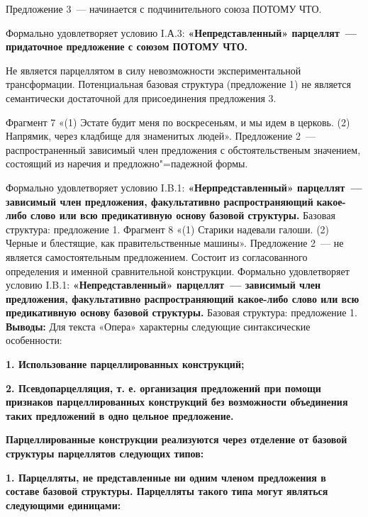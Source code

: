 \documentclass{kursa4}
\begin{document}
     Предложение 3~--- начинается с подчинительного союза ПОТОМУ ЧТО. 

     Формально удовлетворяет условию I.А.3: \textbf{«Непредставленный» парцеллят~--- придаточное предложение с союзом ПОТОМУ ЧТО.} 

     Не является парцеллятом в силу невозможности экспериментальной трансформации. Потенциальная базовая структура (предложение 1) не является семантически достаточной для присоединения предложения 3. 

     Фрагмент 7 «(1) Эстате будит меня по воскресеньям, и мы идем в церковь. (2) Напрямик, через кладбище для знаменитых людей». Предложение 2~--- распространенный зависимый член предложения с обстоятельственым значением, состоящий из наречия и предложно"=падежной формы. 

     Формально удовлетворяет условию I.B.1: \textbf{«}\textbf{Нерпредставленный» парцеллят~--- зависимый член предложения, факультативно распространяющий }\textbf{какое-либо слово или всю предикативную основу базовой структуры. }Базовая структура: предложение 1. Фрагмент 8 «(1) Старики надевали галоши. (2) Черные и блестящие, как правительственные машины». Предложение 2~--- не является самостоятельным предложением. Состоит из согласованного определения и именной сравнительной конструкции. Формально удовлетворяет условию I.B.1: \textbf{«}\textbf{Непредставленный» парцеллят~--- зависимый член предложения, факультативно распространяющий какое-либо слово или всю предикативную основу базовой структуры.} Базовая структура: предложение 1. \textbf{Выводы:} \textmd{Для текста «Опера» характерны следующие синтаксические особенности:}

      {\bfseries\color[rgb]{0.2,0.2,0.2}
      \textmd{1. Использование парцеллированных конструкций;}}

      {\bfseries\color[rgb]{0.2,0.2,0.2}
      \textmd{2. Псевдопарцелляция, т. е. организация предложений при помощи признаков парцеллированных конструкций }\textmd{без возможности объединения таких предложений в одно цельное предложение.}}

      {\bfseries\color[rgb]{0.2,0.2,0.2}
      \textmd{}Парцеллированные конструкции\textmd{ }\textmd{реализуются через отделение от базовой структуры парцеллятов следующих типов}\textmd{:}}

      {\bfseries\color[rgb]{0.2,0.2,0.2}
      \textmd{}\textmd{1. Парцелляты, не представленные ни одним членом предложения в составе базовой структуры. Парцелляты такого типа могут являться следующими единицами:}}
\end{document}
